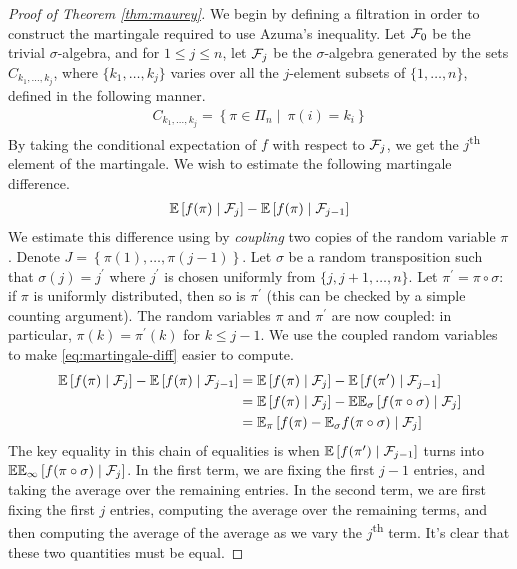 \documentclass[11pt]{article}
\begin{document}
\begin{proof}[Proof of Theorem \ref{thm:maurey}]
  We begin by defining a filtration in order to construct the martingale required to use Azuma's inequality.
  Let $\mathcal{F}_0$ be the trivial $\sigma$-algebra, and for $1 \leq j \leq n$, let $\mathcal{F}_j$ be the $\sigma$-algebra generated by the sets $C_{k_1, \ldots, k_j}$, where $\{k_1, \ldots, k_j\}$ varies over all the $j$-element subsets of $\{1, \ldots, n\}$, defined in the following manner.
  \begin{align*}
    C_{k_1, \ldots, k_j} = \left\{ \pi \in \Pi_n\mid\ \pi(i) = k_i \right\}
  \end{align*}
  By taking the conditional expectation of $f$ with respect to $\mathcal{F}_j$, we get the $j$\textsuperscript{th} element of the martingale.
  We wish to estimate the following martingale difference.
  \begin{align}
    \label{eq:martingale-diff}
    \mathbb{E}\left[ f(\pi) \mid \mathcal{F}_j \right] - \mathbb{E}\left[ f(\pi) \mid \mathcal{F}_{j-1} \right]
  \end{align}
  We estimate this difference using by \emph{coupling} two copies of the random variable $\pi$.
  Denote $J = \left\{ \pi(1), \ldots, \pi(j-1) \right\}$.
  Let $\sigma$ be a random transposition such that $\sigma(j) = j^{\prime}$ where $j^{\prime}$ is chosen uniformly from $\{j, j+1, \ldots, n\}$.
  Let $\pi^{\prime} = \pi \circ \sigma$: if $\pi$ is uniformly distributed, then so is $\pi^{\prime}$ (this can be checked by a simple counting argument).
  The random variables $\pi$ and $\pi^{\prime}$ are now coupled: in particular, $\pi(k) = \pi^{\prime}(k)$ for $k \leq j-1$.
  We use the coupled random variables to make \eqref{eq:martingale-diff} easier to compute.
  \begin{align*}
    \mathbb{E}\left[ f(\pi) \mid \mathcal{F}_j \right] - \mathbb{E}\left[ f(\pi) \mid \mathcal{F}_{j-1} \right]
    &= \mathbb{E}\left[ f(\pi) \mid \mathcal{F}_j \right] - \mathbb{E}\left[ f(\pi^{\prime}) \mid \mathcal{F}_{j-1} \right] \\
    &= \mathbb{E}\left[ f(\pi) \mid \mathcal{F}_j \right] - \mathbb{E}\mathbb{E}_{\sigma} \left[ f(\pi \circ \sigma) \mid \mathcal{F}_{j} \right] \\
    &= \mathbb{E}_{\pi} \left[ f(\pi) - \mathbb{E}_{\sigma} f(\pi \circ \sigma) \mid \mathcal{F}_j \right]
  \end{align*}
  The key equality in this chain of equalities is when $\mathbb{E}\left[ f(\pi^{\prime}) \mid \mathcal{F}_{j-1} \right]$ turns into $\mathbb{E}\mathbb{E}_{\infty}\left[ f(\pi \circ \sigma) \mid \mathcal{F}_{j} \right]$.
  In the first term, we are fixing the first $j-1$ entries, and taking the average over the remaining entries.
  In the second term, we are first fixing the first $j$ entries, computing the average over the remaining terms, and then computing the average of the average as we vary the $j$\textsuperscript{th} term.
  It's clear that these two quantities must be equal.


\end{proof}
\end{document}
